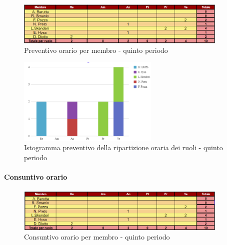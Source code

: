 \begin{figure}[H]
    \centering
    \includegraphics[width=0.9\textwidth]{../Images/preventivoOrario5Periodo.png}
    \caption{Preventivo orario per membro - quinto periodo}
    \label{fig:Preventivo_orario_4}
\end{figure}

\begin{figure}[H]
    \centering
    \includegraphics[width=0.6\textwidth]{../Images/preventivoDivisioneRuoli5Periodo.png}
    \caption{Istogramma preventivo della ripartizione oraria dei ruoli - quinto periodo}
    \label{fig:Preventivo_ripartizione_oraria_4}
\end{figure}

\paragraph*{Consuntivo orario } \hspace{1pt}

\begin{figure}[H]
    \centering
    \includegraphics[width=0.9\textwidth]{../Images/consuntivoOrario5Periodo.png}
    \caption{Consuntivo orario per membro - quinto periodo}
    \label{fig:Constuntivo_orario_4}
\end{figure}

